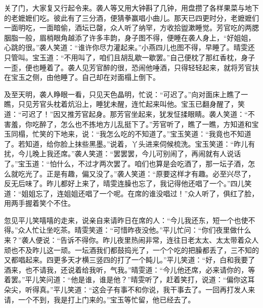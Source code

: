 关了门，大家复又行起令来。袭人等又用大钟斟了几钟，用盘攒了各样果菜与地下的老嬷嬷们吃。彼此有了三分酒，便猜拳赢唱小曲儿。那天已四更时分，老嬷嬷们一面明吃，一面暗偷，酒坛已罄，众人听了纳罕，方收拾盥漱睡觉。芳官吃的两腮胭脂一般，眉梢眼角越添了许多丰韵，身子图不得，便睡在袭人身上，``好姐姐，心跳的很。''袭人笑道：``谁许你尽力灌起来。''小燕四儿也图不得，早睡了。晴雯还只管叫。宝玉道：``不用叫了，咱们且胡乱歇一歇罢。''自己便枕了那红香枕，身子一歪，便也睡着了。袭人见芳官醉的很，恐闹他唾酒，只得轻轻起来，就将芳官扶在宝玉之侧，由他睡了。自己却在对面榻上倒下。

及至天明，袭人睁眼一看，只见天色晶明，忙说：``可迟了。''向对面床上瞧了一瞧，只见芳官头枕着炕沿上，睡犹未醒，连忙起来叫他。宝玉已翻身醒了，笑道：``可迟了！''因又推芳官起身。那芳官坐起来，犹发怔揉眼睛。袭人笑道：``不害羞，你吃醉了，怎么也不拣地方儿乱挺下了。''芳官听了，瞧了一瞧，方知道和宝玉同榻，忙笑的下地来，说：``我怎么吃的不知道了。''宝玉笑道：``我竟也不知道了。若知道，给你脸上抹些黑墨。''说着，丫头进来伺候梳洗。宝玉笑道：``昨儿有扰，今儿晚上我还席。''袭人笑道：``罢罢罢，今儿可别闹了，再闹就有人说话了。''宝玉道：``怕什么，不过才两次罢了。咱们也算是会吃酒了，那一坛子酒，怎么就吃光了。正是有趣，偏又没了。''袭人笑道：``原要这样才有趣。必至兴尽了，反无后味了。昨儿都好上来了，晴雯连臊也忘了，我记得他还唱了一个。''四儿笑道：``姐姐忘了，连姐姐还唱了一个呢。在席的谁没唱过！''众人听了，俱红了脸，用两手握着笑个不住。

忽见平儿笑嘻嘻的走来，说亲自来请昨日在席的人：``今儿我还东，短一个也使不得。''众人忙让坐吃茶。晴雯笑道：``可惜昨夜没他。''平儿忙问：``你们夜里做什么来？''袭人便说：``告诉不得你。昨儿夜里热闹非常，连往日老太太、太太带着众人顽也不及昨儿这一顽。一坛酒我们都鼓捣光了，一个个吃的把臊都丢了，三不知的又都唱起来。四更多天才横三竖四的打了一个盹儿。''平儿笑道：``好，白和我要了酒来，也不请我，还说着给我听，气我。''晴雯道：``今儿他还席，必来请你的，等着罢。''平儿笑问道：``他是谁，谁是他？''晴雯听了，赶着笑打，说道：``偏你这耳朵尖，听得真。''平儿笑道：``这会子有事不和你说，我干事去了。一回再打发人来请，一个不到，我是打上门来的。''宝玉等忙留，他已经去了。

